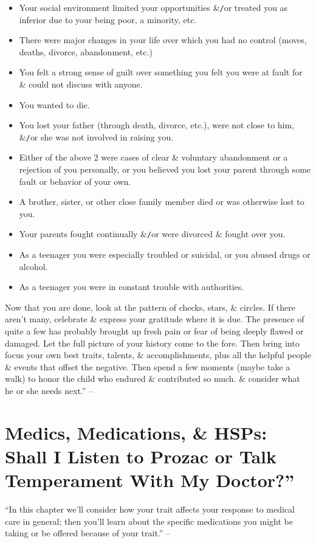 \documentclass{article}
\numberwithin{equation}{section}
\begin{document}
\begin{itemize}
	\item Your social environment limited your opportunities \&{\tt/}or treated you as inferior due to your being poor, a minority, etc.
	\item There were major changes in your life over which you had no control (moves, deaths, divorce, abandonment, etc.)
	\item You felt a strong sense of guilt over something you felt you were at fault for \& could not discuss with anyone.
	\item You wanted to die.
	\item You lost your father (through death, divorce, etc.), were not close to him, \&{\tt/}or she was not involved in raising you.
	\item Either of the above 2 were cases of clear \& voluntary abandonment or a rejection of you personally, or you believed you lost your parent through some fault or behavior of your own.
	\item A brother, sister, or other close family member died or was otherwise lost to you.
	\item Your parents fought continually \&{\tt/}or were divorced \& fought over you.
	\item As a teenager you were especially troubled or suicidal, or you abused drugs or alcohol.
	\item As a teenager you were in constant trouble with authorities.
\end{itemize}
Now that you are done, look at the pattern of checks, stars, \& circles. If there aren't many, celebrate \& express your gratitude where it is due. The presence of quite a few has probably brought up fresh pain or fear of being deeply flawed or damaged. Let the full picture of your history come to the fore. Then bring into focus your own best traits, talents, \& accomplishments, plus all the helpful people \& events that offset the negative. Then spend a few moments (maybe take a walk) to honor the child who endured \& contributed so much. \& consider what he or she needs next.'' -- \cite[pp. 217--219]{Aron2013}


\section{Medics, Medications, \& HSPs: Shall I Listen to Prozac or Talk Temperament With My Doctor?''}
``In this chapter we'll consider how your trait affects your response to medical care in general; then you'll learn about the specific medications you might be taking or be offered because of your trait.'' -- \cite[p. 220]{Aron2013}
\end{document}
